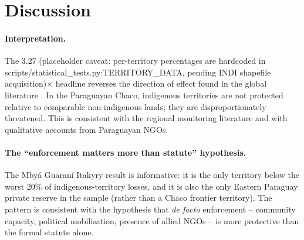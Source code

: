 \section{Discussion}
\label{sec:yvy-discussion}

\paragraph{Interpretation.} The 3.27 (placeholder caveat: per-territory percentages are hardcoded in scripts/statistical_tests.py:TERRITORY_DATA, pending INDI shapefile acquisition)$\times$ headline reverses the
direction of effect found in the global literature \citep{sze2022}. In
the Paraguayan Chaco, indigenous territories are not protected relative
to comparable non-indigenous lands; they are disproportionately
threatened. This is consistent with the regional monitoring literature
and with qualitative accounts from Paraguayan NGOs.

\paragraph{The ``enforcement matters more than statute'' hypothesis.}
The Mby\'a Guaran\'i Itakyry result is informative: it is the only
territory below the worst 20\% of indigenous-territory losses, and it
is also the only Eastern Paraguay private reserve in the sample
(rather than a Chaco frontier territory). The pattern is consistent
with the hypothesis that \emph{de facto} enforcement -- community
capacity, political mobilisation, presence of allied NGOs -- is more
protective than the formal statute alone.

